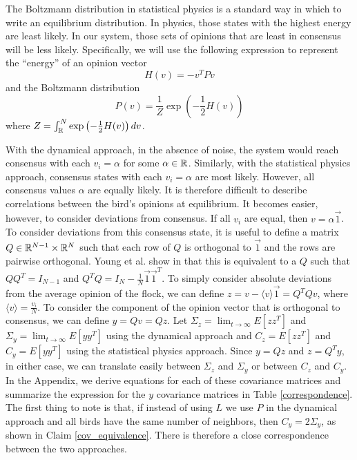 \documentclass{article}
\begin{document}
The Boltzmann distribution in statistical physics is a standard way in which to write an equilibrium distribution. In physics, those states with the highest energy are least likely. In our system, those sets of opinions that are least in consensus will be less likely. Specifically, we will use the following expression to represent the ``energy'' of an opinion vector
\begin{equation}
H(v)=-v^TPv \label{Hamiltonian}
\end{equation}
and the Boltzmann distribution
\begin{equation}
P(v)=\frac{1}{Z}\exp\left(-\frac{1}{2}H(v)\right) \label{Boltzmann}
\end{equation}
where $Z=\int_{\mathbb{R}}^N\exp\left(-\frac{1}{2}H(v)\right)dv$.

With the dynamical approach, in the absence of noise, the system would reach consensus with each $v_i=\alpha$ for some $\alpha\in{\mathbb{R}}$. Similarly, with the statistical physics approach, consensus states with each $v_i=\alpha$ are most likely. However, all consensus values $\alpha$ are equally likely. It is therefore difficult to describe correlations between the bird's opinions at equilibrium. It becomes easier, however, to consider deviations from consensus. If all $v_i$ are equal, then $v=\alpha\vec{1}$. To consider deviations from this consensus state, it is useful to define a matrix $Q\in{\mathbb{R}}^{N-1}\times{\mathbb{R}}^N$ such that each row of $Q$ is orthogonal to $\vec{1}$ and the rows are pairwise orthogonal. Young et al. show in \cite{Young:2010fk,Young:2013kx} that this is equivalent to a $Q$ such that $QQ^T=I_{N-1}$ and $Q^TQ=I_N-\frac{1}{N}\vec{1}\vec{1}^T$. To simply consider absolute deviations from the average opinion of the flock, we can define $z=v-\langle v\rangle \vec{1}=Q^TQv$, where $\langle v \rangle =\frac{v_i}{N}$. To consider the component of the opinion vector that is orthogonal to consensus, we can define $y=Qv=Qz$. Let $\Sigma_z=\lim_{t\to\infty}E[zz^T]$ and $\Sigma_y=\lim_{t\to\infty}E[yy^T]$ using the dynamical approach and $C_z=E[zz^T]$ and $C_y=E[yy^T]$ using the statistical physics approach. Since $y=Qz$ and $z=Q^Ty$, in either case, we can translate easily between $\Sigma_z$ and $\Sigma_y$ or between $C_z$ and $C_y$. In the Appendix, we derive equations for each of these covariance matrices and summarize the expression for the $y$ covariance matrices in Table \ref{correspondence}.  The first thing to note is that, if instead of using $L$ we use $P$ in the dynamical approach and all birds have the same number of neighbors, then $C_y=2\Sigma_y$, as shown in Claim \ref{cov_equivalence}. There is therefore a close correspondence between the two approaches.
\end{document}

